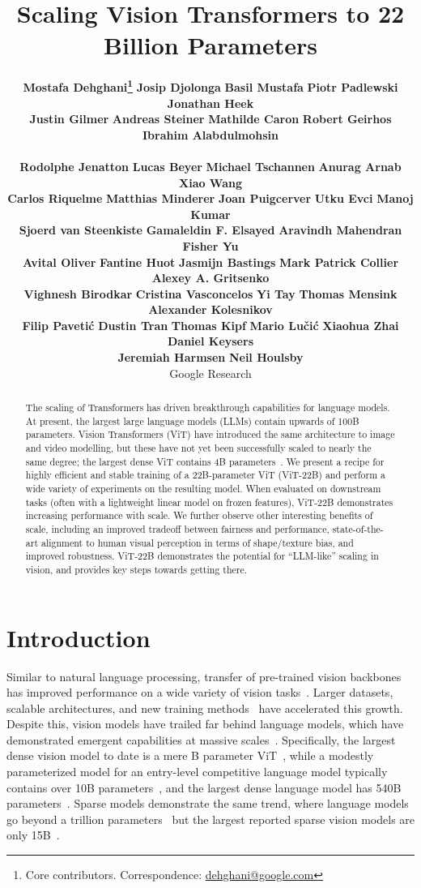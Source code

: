 \documentclass{article}
\title{
\vspace{-10mm}
\textbf{
Scaling Vision Transformers to 22 Billion Parameters
}
\vspace{-3mm}
}
\author{
\normalsize{}
\textbf{Mostafa Dehghani\thanks{Core contributors. Correspondence: \url{dehghani@google.com}}} \hspace{5mm} 
\textbf{Josip Djolonga\footnotemark[1]} \hspace{3mm} 
\textbf{Basil Mustafa\footnotemark[1]} \hspace{3mm} 
\textbf{Piotr Padlewski\footnotemark[1]} \hspace{3mm} 
\textbf{Jonathan Heek\footnotemark[1]} 
\\
\normalsize{}
\textbf{Justin Gilmer} \hspace{3mm} 
\textbf{Andreas Steiner} \hspace{3mm} 
\textbf{Mathilde Caron} \hspace{3mm} 
\textbf{Robert Geirhos} \hspace{3mm} 
\textbf{Ibrahim  Alabdulmohsin}

\\
\normalsize{}
\textbf{Rodolphe Jenatton} \hspace{3mm} 
\textbf{Lucas Beyer} \hspace{3mm} 
\textbf{Michael Tschannen} \hspace{3mm} 
\textbf{Anurag Arnab} \hspace{3mm} 
\textbf{Xiao Wang}
\\
\normalsize{}
\textbf{Carlos Riquelme} \hspace{3mm} 
\textbf{Matthias Minderer} \hspace{3mm} 
\textbf{Joan Puigcerver} \hspace{3mm} 
\textbf{Utku Evci} \hspace{3mm} 
\textbf{Manoj Kumar}
\\
\normalsize{}
\textbf{Sjoerd van Steenkiste} \hspace{3mm} 
\textbf{Gamaleldin F. Elsayed} \hspace{3mm} 
\textbf{Aravindh Mahendran} \hspace{3mm} 
\textbf{Fisher Yu}
\\
\normalsize{}
\textbf{Avital Oliver} \hspace{3mm} 
\textbf{Fantine Huot} \hspace{3mm} 
\textbf{Jasmijn Bastings} \hspace{3mm} 
\textbf{Mark Patrick Collier} \hspace{3mm} 
\textbf{Alexey A. Gritsenko}
\\
\normalsize{}
\textbf{Vighnesh Birodkar} \hspace{3mm} 
\textbf{Cristina Vasconcelos} \hspace{3mm} 
\textbf{Yi Tay} \hspace{3mm} 
\textbf{Thomas Mensink} \hspace{3mm} 
\textbf{Alexander Kolesnikov}
\\
\normalsize{}
\textbf{Filip Pavetić} \hspace{3mm} 
\textbf{Dustin Tran} \hspace{3mm} 
\textbf{Thomas Kipf} \hspace{3mm} 
\textbf{Mario Lučić} \hspace{3mm} 
\textbf{Xiaohua Zhai} \hspace{3mm} 
\textbf{Daniel Keysers}
\\
\normalsize{}
\textbf{Jeremiah Harmsen} \hspace{3mm} 
\textbf{Neil Houlsby\footnotemark[1]}
\\ 
\vspace{7mm}
\normalsize{}
Google Research
\vspace{-7mm}
}
\date{}
\newcommand{\chonk}{\mbox{ViT-22B}\xspace}
\begin{document}
\setlength{\abovedisplayskip}{4pt}
\setlength{\belowdisplayskip}{4pt}
\setlength{\abovedisplayshortskip}{0pt}
\setlength{\belowdisplayshortskip}{0pt}

\doparttoc \faketableofcontents \maketitle

\begin{abstract}

The scaling of Transformers has driven breakthrough capabilities for language models.
At present, the largest large language models (LLMs) contain upwards of 100B parameters.
Vision Transformers (ViT) have introduced the same architecture to image and video modelling, but these have not yet been successfully scaled to nearly the same degree; the largest dense ViT contains 4B parameters~\citep{chen2022pali}.
We present a recipe for highly efficient and stable training of a 22B-parameter ViT (\chonk) and perform a wide variety of experiments on the resulting model.
When evaluated on downstream tasks (often with a lightweight linear model on frozen features), \chonk demonstrates increasing performance with scale.
We further observe other interesting benefits of scale, including an improved tradeoff between fairness and performance, state-of-the-art alignment to human visual perception in terms of shape/texture bias, and improved robustness.
\chonk demonstrates the potential for ``LLM-like'' scaling in vision, and provides key steps towards getting there.
\end{abstract}
 \section{Introduction}
Similar to natural language processing, transfer of pre-trained vision backbones has improved performance on a wide variety of vision tasks~\citep{pan2009survey,zhai2019large,kolesnikov2020big}.
Larger datasets, scalable architectures, and new training methods~\citep{mahajan2018exploring,dosovitskiy2020image,clip,zhai2022scaling} have accelerated this growth. Despite this, vision models have trailed far behind language models, which have demonstrated emergent capabilities at massive scales~\citep{chowdhery2022palm, wei2022emergent}. Specifically, the largest dense vision model to date is a mere B parameter ViT~\citep{chen2022pali}, while a modestly parameterized model for an entry-level competitive language model typically contains over 10B parameters~\citep{t5paper,tay2022unifying,chung2022scaling}, and the largest dense language model has 540B parameters~\citep{chowdhery2022palm}. Sparse models demonstrate the same trend, where language models go beyond a trillion parameters~\citep{fedus2021switch} but the largest reported sparse vision models are only 15B~\citep{riquelme2021scaling}.
\end{document}
